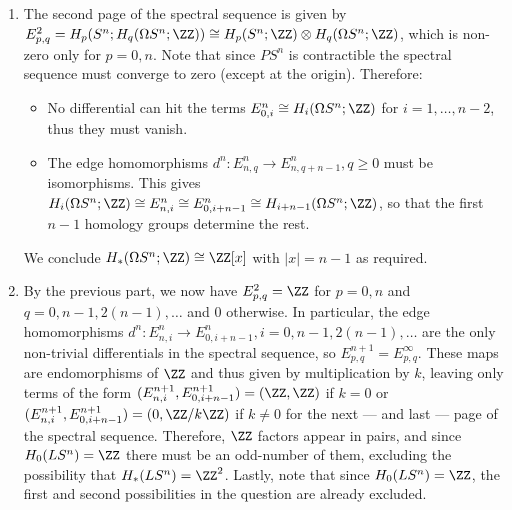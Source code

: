 \begin{enumerate}
    
    
    \item The second page of the spectral sequence is given by $E^2_{p,q}=H_p(S^n;H_q(\Omega S^n;\ZZ))\cong H_p(S^n;\ZZ)\otimes H_q(\Omega S^n;\ZZ)$, which is non-zero only for $p=0,n$. Note that since $PS^n$ is contractible the spectral sequence must converge to zero (except at the origin). Therefore:
    \begin{itemize}
        \item No differential can hit the terms $E^n_{0,i}\cong H_i(\Omega S^n;\ZZ)$ for $i=1,\dots,n-2$, thus they must vanish.
        \item The edge homomorphisms $d^n:E^n_{n,q}\to E^n_{n,q+n-1}, q\geq0$ must be isomorphisms. This gives $H_i(\Omega S^n;\ZZ)\cong E^n_{n,i}\cong E^n_{0,i+n-1}\cong H_{i+n-1}(\Omega S^n;\ZZ)$, so that the first $n-1$ homology groups determine the rest. 
    \end{itemize}
    We conclude $H_*(\Omega S^n;\ZZ)\cong \ZZ[x]$ with $|x|=n-1$ as required.
    
    \item By the previous part, we now have $E^2_{p,q}=\ZZ$ for $p=0,n$ and $q=0,n-1,2(n-1),\dots$ and $0$ otherwise. In particular, the edge homomorphisms $d^n:E^n_{n,i}\to E^n_{0,i+n-1}, i=0,n-1,2(n-1),\dots$ are the only non-trivial differentials in the spectral sequence, so $E^{n+1}_{p,q}=E^\infty_{p,q}$.  These maps are endomorphisms of $\ZZ$ and thus given by multiplication by $k$, leaving only terms of the form $(E^{n+1}_{n,i},E^{n+1}_{0,i+n-1})=(\ZZ,\ZZ)$ if $k=0$ or $(E^{n+1}_{n,i},E^{n+1}_{0,i+n-1})=(0,\ZZ/k\ZZ)$ if $k\neq 0$ for the next --- and last --- page of the spectral sequence. Therefore, $\ZZ$ factors appear in pairs, and since $H_0(LS^n)=\ZZ$ there must be an odd-number of them, excluding the possibility that $H_*(LS^n)=\ZZ^2$. Lastly, note that since $H_0(LS^n)=\ZZ$, the first and second possibilities in the question are already excluded. 
    

\end{enumerate}
